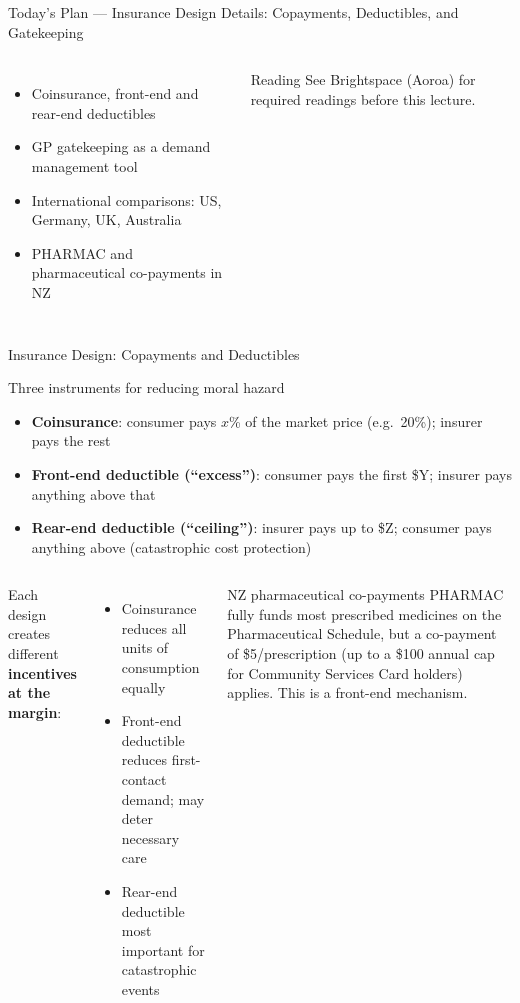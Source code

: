 \documentclass[aspectratio=169, 12pt]{beamer}
\newcommand{\planslide}[2]{%
  \begin{frame}{Today's Plan — #1}
    \begin{columns}
      \column{0.6\textwidth}
      \begin{itemize}#2\end{itemize}
      \column{0.38\textwidth}
      \begin{alertblock}{Reading}
        \footnotesize See Brightspace (Aoroa) for required readings before this lecture.
      \end{alertblock}
    \end{columns}
  \end{frame}}
\begin{document}
\planslide{Insurance Design Details: Copayments, Deductibles, and Gatekeeping}{
  \item Coinsurance, front-end and rear-end deductibles
  \item GP gatekeeping as a demand management tool
  \item International comparisons: US, Germany, UK, Australia
  \item PHARMAC and pharmaceutical co-payments in NZ
}

\begin{frame}{Insurance Design: Copayments and Deductibles}
  \begin{block}{Three instruments for reducing moral hazard}
    \begin{itemize}
      \item \textbf{Coinsurance}: consumer pays $x$\% of the market price (e.g.\ 20\%);
            insurer pays the rest
      \item \textbf{Front-end deductible (``excess'')}: consumer pays the first \$Y;
            insurer pays anything above that
      \item \textbf{Rear-end deductible (``ceiling'')}: insurer pays up to \$Z;
            consumer pays anything above (catastrophic cost protection)
    \end{itemize}
  \end{block}
  \begin{columns}
      Each design creates different \textbf{incentives at the margin}:
      \begin{itemize}
        \item Coinsurance reduces all units of consumption equally
        \item Front-end deductible reduces first-contact demand; may deter necessary care
        \item Rear-end deductible most important for catastrophic events
      \end{itemize}
      \begin{exampleblock}{NZ pharmaceutical co-payments}
        PHARMAC fully funds most prescribed medicines on the Pharmaceutical Schedule, but a
        co-payment of \$5/prescription (up to a \$100 annual cap for Community Services Card
        holders) applies. This is a front-end mechanism.
      \end{exampleblock}
  \end{columns}
\end{frame}
\end{document}
